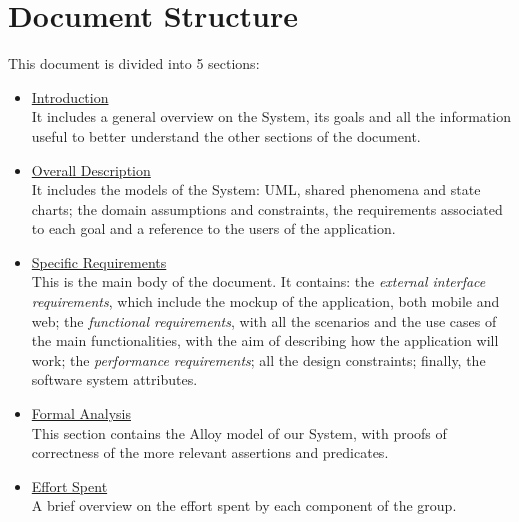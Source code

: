 \section{Document Structure}

This document is divided into 5 sections:

\begin{itemize}

\item \underline{Introduction} \\
It includes a general overview on the System, its goals and all the information useful to better understand the other sections of the document.

\item \underline{Overall Description} \\
It includes the models of the System: UML, shared phenomena and state charts; the domain assumptions and constraints, the requirements associated to each goal and a reference to the users of the application.

\item \underline{Specific Requirements} \\
This is the main body of the document. It contains: the \textit{external interface requirements}, which include the mockup of the application, both mobile and web; the \textit{functional requirements}, with all the scenarios and the use cases of the main functionalities, with the aim of describing how the application will work; the \textit{performance requirements}; all the design constraints; finally, the software system attributes.

\item \underline{Formal Analysis} \\
This section contains the Alloy model of our System, with proofs of correctness of the more relevant assertions and predicates.

\item \underline{Effort Spent} \\
A brief overview on the effort spent by each component of the group.

\end{itemize}